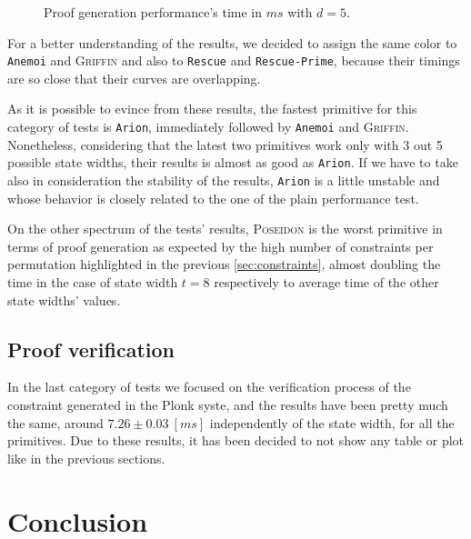 \documentclass[12pt, a4paper]{report}
\begin{document}
\begin{figure}[H]
  \hspace{60pt}
  \caption{Proof generation performance's time in $ms$ with $d = 5$.}\label{plot:proofgen}
\end{figure}

For a better understanding of the results, we decided to assign the same color to \texttt{Anemoi} and \textsc{Griffin} and also to \texttt{Rescue} and \texttt{Rescue-Prime}, because their timings are so close that their curves are overlapping.

As it is possible to evince from these results, the fastest primitive for this category of tests is \texttt{Arion}, immediately followed by \texttt{Anemoi} and \textsc{Griffin}.
Nonetheless, considering that the latest two primitives work only with 3 out 5 possible state widths, their results is almost as good as \texttt{Arion}.
If we have to take also in consideration the stability of the results, \texttt{Arion} is a little unstable and whose behavior is closely related to the one of the plain performance test.

On the other spectrum of the tests' results, \textsc{Poseidon} is the worst primitive in terms of proof generation as expected by the high number of constraints per permutation highlighted in the previous \autoref{sec:constraints}, almost doubling the time in the case of state width $t = 8$ respectively to average time of the other state widths' values.

\section{Proof verification}\label{sec:proofver}

In the last category of tests we focused on the verification process of the constraint generated in the Plonk syste, and the results have been pretty much the same, around $7.26\pm0.03\ [ms]$ independently of the state width, for all the primitives.
Due to these results, it has been decided to not show any table or plot like in the previous sections.

\chapter{Conclusion}\label{chap:conclusion}
\end{document}
